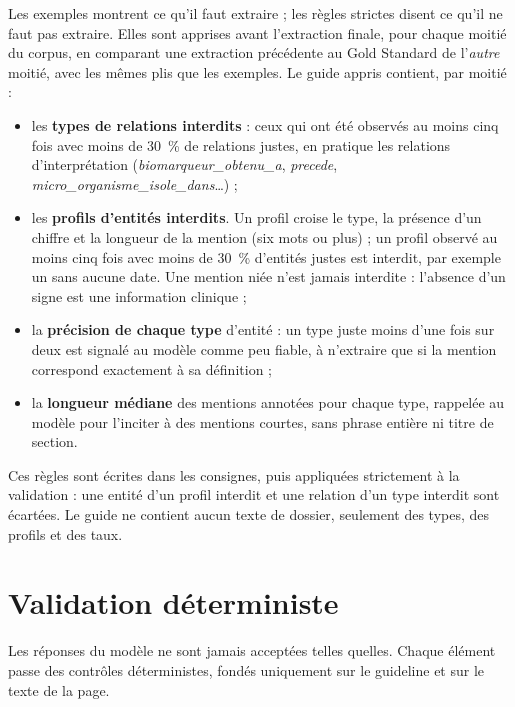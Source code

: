 Les exemples montrent ce qu'il faut extraire ; les règles strictes disent ce qu'il ne faut pas extraire. Elles sont apprises avant l'extraction finale, pour chaque moitié du corpus, en comparant une extraction précédente au Gold Standard de l'\emph{autre} moitié, avec les mêmes plis que les exemples. Le guide appris contient, par moitié :
\begin{itemize}
  \item les \textbf{types de relations interdits} : ceux qui ont été observés au moins cinq fois avec moins de 30~\% de relations justes, en pratique les relations d'interprétation (\emph{biomarqueur\_obtenu\_a}, \emph{precede}, \emph{micro\_organisme\_isole\_dans}\dots) ;
  \item les \textbf{profils d'entités interdits}. Un profil croise le type, la présence d'un chiffre et la longueur de la mention (six mots ou plus) ; un profil observé au moins cinq fois avec moins de 30~\% d'entités justes est interdit, par exemple un  sans aucune date. Une mention niée n'est jamais interdite : l'absence d'un signe est une information clinique ;
  \item la \textbf{précision de chaque type} d'entité : un type juste moins d'une fois sur deux est signalé au modèle comme peu fiable, à n'extraire que si la mention correspond exactement à sa définition ;
  \item la \textbf{longueur médiane} des mentions annotées pour chaque type, rappelée au modèle pour l'inciter à des mentions courtes, sans phrase entière ni titre de section.
\end{itemize}
Ces règles sont écrites dans les consignes, puis appliquées strictement à la validation : une entité d'un profil interdit et une relation d'un type interdit sont écartées. Le guide ne contient aucun texte de dossier, seulement des types, des profils et des taux.

\section{Validation déterministe}\label{sec:c4-entites}

Les réponses du modèle ne sont jamais acceptées telles quelles. Chaque élément passe des contrôles déterministes, fondés uniquement sur le guideline et sur le texte de la page.

